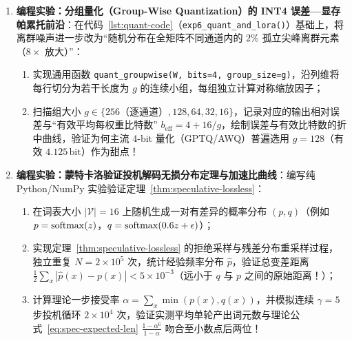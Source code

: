 
\begin{enumerate}
  \item[\textbf{6.6.7}] \textbf{编程实验：分组量化（Group-Wise Quantization）的 INT4 误差—显存帕累托前沿}：在代码~\ref{lst:quant-code}（\texttt{exp6\_quant\_and\_lora()}）基础上，将离群噪声进一步改为“随机分布在全矩阵不同通道内的 $2\%$ 孤立尖峰离群元素（$8\times$ 放大）”：
  \begin{enumerate}
    \item 实现通用函数 \texttt{quant\_groupwise(W, bits=4, group\_size=g)}，沿列维将每行切分为若干长度为 $g$ 的连续小组，每组独立计算对称缩放因子；
    \item 扫描组大小 $g \in \{256\text{（逐通道）}, 128, 64, 32, 16\}$，记录对应的输出相对误差与“有效平均每权重比特数” $b_{\mathrm{eff}} = 4 + 16 / g$，绘制误差与有效比特数的折中曲线，验证为何主流 4-bit 量化（GPTQ/AWQ）普遍选用 $g = 128$（有效 $4.125\,\mathrm{bit}$）作为甜点！
  \end{enumerate}

\par\pagebreak[4]
  \item[\textbf{6.6.8}] \textbf{编程实验：蒙特卡洛验证投机解码无损分布定理与加速比曲线}：编写纯 Python/NumPy 实验验证定理~\ref{thm:speculative-lossless}：
  \begin{enumerate}
    \item 在词表大小 $|\mathcal{V}| = 16$ 上随机生成一对有差异的概率分布 $(p, q)$（例如 $p = \operatorname{softmax}(z)$，$q = \operatorname{softmax}(0.6 z + \epsilon)$）；
    \item 实现定理~\ref{thm:speculative-lossless} 的拒绝采样与残差分布重采样过程，独立重复 $N = 2\times 10^5$ 次，统计经验频率分布 $\hat{p}$，验证总变差距离 $\frac{1}{2}\sum_x |\hat{p}(x) - p(x)| < 5\times 10^{-3}$（远小于 $q$ 与 $p$ 之间的原始距离！）；
    \item 计算理论一步接受率 $\alpha = \sum_x \min(p(x), q(x))$，并模拟连续 $\gamma = 5$ 步投机循环 $2\times 10^4$ 次，验证实测平均单轮产出词元数与理论公式~\eqref{eq:spec-expected-len} $\frac{1 - \alpha^6}{1 - \alpha}$ 吻合至小数点后两位！
  \end{enumerate}
\end{enumerate}
